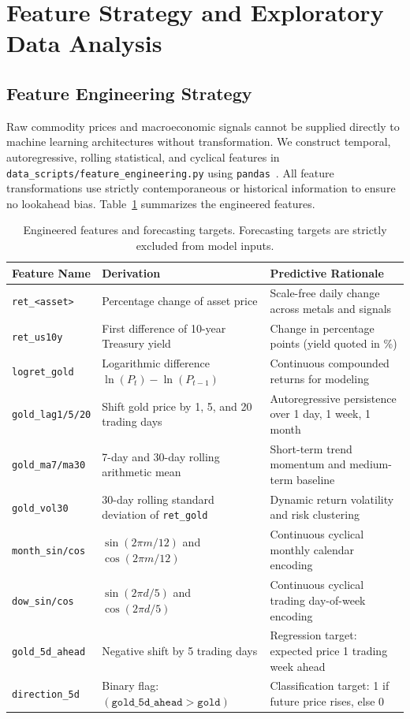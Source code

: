 \section{Feature Strategy and Exploratory Data Analysis}
\label{sec:features_eda}

\subsection{Feature Engineering Strategy}

Raw commodity prices and macroeconomic signals cannot be supplied directly to machine learning architectures without transformation. We construct temporal, autoregressive, rolling statistical, and cyclical features in \texttt{data\_scripts/feature\_engineering.py} using \texttt{pandas}~\cite{b_mckinney2010}. All feature transformations use strictly contemporaneous or historical information to ensure no lookahead bias. Table~\ref{tab:features_taxonomy} summarizes the engineered features.

\begin{table}[H]
  \centering
  \small
  \begin{tabular}{lp{}p{}}
    \toprule
    Feature Name & Derivation & Predictive Rationale \\
    \midrule
    \texttt{ret\_<asset>} & Percentage change of asset price & Scale-free daily change across metals and signals \\
    \texttt{ret\_us10y} & First difference of 10-year Treasury yield & Change in percentage points (yield quoted in \%) \\
    \texttt{logret\_gold} & Logarithmic difference $\ln(P_t) - \ln(P_{t-1})$ & Continuous compounded returns for modeling \\
    \texttt{gold\_lag1/5/20} & Shift gold price by 1, 5, and 20 trading days & Autoregressive persistence over 1 day, 1 week, 1 month \\
    \texttt{gold\_ma7/ma30} & 7-day and 30-day rolling arithmetic mean & Short-term trend momentum and medium-term baseline \\
    \texttt{gold\_vol30} & 30-day rolling standard deviation of \texttt{ret\_gold} & Dynamic return volatility and risk clustering \\
    \texttt{month\_sin/cos} & $\sin(2\pi m / 12)$ and $\cos(2\pi m / 12)$ & Continuous cyclical monthly calendar encoding \\
    \texttt{dow\_sin/cos} & $\sin(2\pi d / 5)$ and $\cos(2\pi d / 5)$ & Continuous cyclical trading day-of-week encoding \\
    \midrule
    \texttt{gold\_5d\_ahead} & Negative shift by 5 trading days & Regression target: expected price 1 trading week ahead \\
    \texttt{direction\_5d} & Binary flag: $(\texttt{gold\_5d\_ahead} > \texttt{gold})$ & Classification target: 1 if future price rises, else 0 \\
    \bottomrule
  \end{tabular}
  \caption{Engineered features and forecasting targets. Forecasting targets are strictly excluded from model inputs.}
  \label{tab:features_taxonomy}
\end{table}

